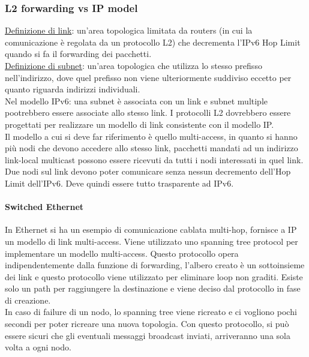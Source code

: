 \documentclass{article}
\begin{document}
\subsubsection{L2 forwarding vs IP model}
\underline{Definizione di link}: un'area topologica limitata da routers (in cui la comunicazione è regolata da un protocollo L2) che decrementa l'IPv6 Hop Limit quando si fa il forwarding dei pacchetti.\\
\underline{Definizione di subnet}: un'area topologica che utilizza lo stesso prefisso nell'indirizzo, dove quel prefisso non viene ulteriormente suddiviso eccetto per quanto riguarda indirizzi individuali. \\
Nel modello IPv6: una subnet è associata con un link e subnet multiple pootrebbero essere associate allo stesso link. I protocolli L2 dovrebbero essere progettati per realizzare un modello di link consistente con il modello IP. \\
Il modello a cui si deve far riferimento è quello multi-access, in quanto si hanno più nodi che devono accedere allo stesso link, pacchetti mandati ad un indirizzo link-local multicast possono essere ricevuti da tutti i nodi interessati in quel link. Due nodi sul link devono poter comunicare senza nessun decremento dell'Hop Limit dell'IPv6. Deve quindi essere tutto trasparente ad IPv6.
\paragraph{Switched Ethernet}
In Ethernet si ha un esempio di comunicazione cablata multi-hop, fornisce a IP un modello di link multi-access. Viene utilizzato uno spanning tree protocol per implementare un modello multi-access. Questo protocollo opera indipendentemente dalla funzione di forwarding, l'albero creato è un sottoinsieme dei link e questo protocollo viene utilizzato per eliminare loop non graditi. Esiste solo un path per raggiungere la destinazione e viene deciso dal protocollo in fase di creazione. \\ In caso di failure di un nodo, lo spanning tree viene ricreato e ci vogliono pochi secondi per poter ricreare una nuova topologia. Con questo protocollo, si può essere sicuri che gli eventuali messaggi broadcast inviati, arriveranno una sola volta a ogni nodo.
\end{document}
